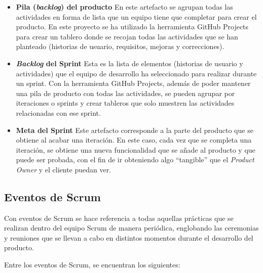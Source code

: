 \begin{itemize}
    \item \textbf{Pila (\textit{backlog}) del producto}
    \newline
    En este artefacto se agrupan todas las actividades en forma de lista que un equipo tiene que completar para crear el
    producto. En este proyecto se ha utilizado la herramienta GitHub Projects para crear un tablero donde se recojan
    todas las actividades que se han planteado (historias de usuario, requisitos, mejoras y correcciones).

    \item \textbf{\textit{Backlog} del Sprint}
    \newline
    Esta es la lista de elementos (historias de usuario y actividades) que el equipo de desarrollo ha seleccionado para
    realizar durante un sprint. Con la herramienta GitHub Projects, además de poder mantener una pila de producto con todas
    las actividades, se pueden agrupar por iteraciones o sprints y crear tableros que solo muestren las
    actividades relacionadas con ese sprint.

    \item \textbf{Meta del Sprint}
    \newline
    Este artefacto corresponde a la parte del producto que se obtiene al acabar una iteración. En este caso, cada vez
    que se completa una iteración, se obtiene una nueva funcionalidad que se añade al producto y que puede ser probada, con el fin
    de ir obteniendo algo ``tangible'' que el \textit{Product Owner} y el cliente puedan ver.
\end{itemize}

\subsection{Eventos de Scrum}

Con eventos de Scrum se hace referencia a todas aquellas prácticas que se realizan dentro del equipo Scrum de manera periódica,
englobando las ceremonias y reuniones que se llevan a cabo en distintos momentos durante el desarrollo del producto.

Entre los eventos de Scrum, se encuentran los siguientes:

